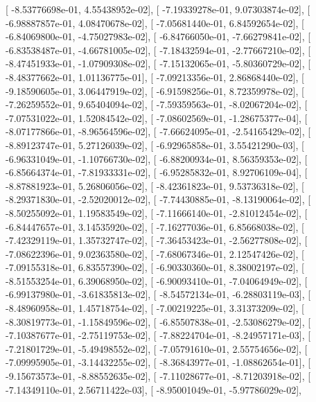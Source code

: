 \documentclass{article}
\begin{document}
       [ -8.53776698e-01,   4.55438952e-02],
       [ -7.19339278e-01,   9.07303874e-02],
       [ -6.98887857e-01,   4.08470678e-02],
       [ -7.05681440e-01,   6.84592654e-02],
       [ -6.84069800e-01,  -4.75027983e-02],
       [ -6.84766050e-01,  -7.66279841e-02],
       [ -6.83538487e-01,  -4.66781005e-02],
       [ -7.18432594e-01,  -2.77667210e-02],
       [ -8.47451933e-01,  -1.07909308e-02],
       [ -7.15132065e-01,  -5.80360729e-02],
       [ -8.48377662e-01,   1.01136775e-01],
       [ -7.09213356e-01,   2.86868440e-02],
       [ -9.18590605e-01,   3.06447919e-02],
       [ -6.91598256e-01,   8.72359978e-02],
       [ -7.26259552e-01,   9.65404094e-02],
       [ -7.59359563e-01,  -8.02067204e-02],
       [ -7.07531022e-01,   1.52084542e-02],
       [ -7.08602569e-01,  -1.28675377e-04],
       [ -8.07177866e-01,  -8.96564596e-02],
       [ -7.66624095e-01,  -2.54165429e-02],
       [ -8.89123747e-01,   5.27126039e-02],
       [ -6.92965858e-01,   3.55421290e-03],
       [ -6.96331049e-01,  -1.10766730e-02],
       [ -6.88200934e-01,   8.56359353e-02],
       [ -6.85664374e-01,  -7.81933331e-02],
       [ -6.95285832e-01,   8.92706109e-04],
       [ -8.87881923e-01,   5.26806056e-02],
       [ -8.42361823e-01,   9.53736318e-02],
       [ -8.29371830e-01,  -2.52020012e-02],
       [ -7.74430885e-01,  -8.13190064e-02],
       [ -8.50255092e-01,   1.19583549e-02],
       [ -7.11666140e-01,  -2.81012454e-02],
       [ -6.84447657e-01,   3.14535920e-02],
       [ -7.16277036e-01,   6.85668038e-02],
       [ -7.42329119e-01,   1.35732747e-02],
       [ -7.36453423e-01,  -2.56277808e-02],
       [ -7.08622396e-01,   9.02363580e-02],
       [ -7.68067346e-01,   2.12547426e-02],
       [ -7.09155318e-01,   6.83557390e-02],
       [ -6.90330360e-01,   8.38002197e-02],
       [ -8.51553254e-01,   6.39068950e-02],
       [ -6.90093410e-01,  -7.04064949e-02],
       [ -6.99137980e-01,  -3.61835813e-02],
       [ -8.54572134e-01,  -6.28803119e-03],
       [ -8.48960958e-01,   1.45718754e-02],
       [ -7.00219225e-01,   3.31373209e-02],
       [ -8.30819773e-01,  -1.15849596e-02],
       [ -6.85507838e-01,  -2.53086279e-02],
       [ -7.10387677e-01,  -2.75119753e-02],
       [ -7.88224704e-01,  -8.24957171e-03],
       [ -7.21801729e-01,  -5.49498552e-02],
       [ -7.05791610e-01,   2.55754656e-02],
       [ -7.09995905e-01,  -3.14432255e-02],
       [ -8.36843977e-01,  -1.08862654e-01],
       [ -9.15673573e-01,  -8.88552635e-02],
       [ -7.11028677e-01,  -8.71203918e-02],
       [ -7.14349110e-01,   2.56711422e-03],
       [ -8.95001049e-01,  -5.97786029e-02],
\end{document}
